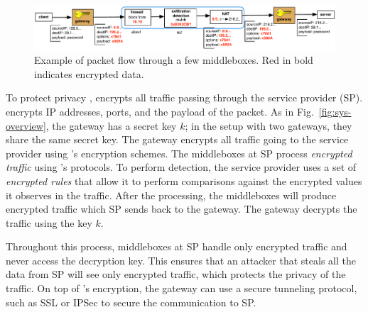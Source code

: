 \begin{figure}[t!]
\centering
  \includegraphics[width=6.7in]{fig/packetpath.pdf}
\caption{Example of packet flow through a few middleboxes. Red in bold indicates encrypted data. \label{fig:packetflow}}
\end{figure}



To protect privacy , \sys encrypts all traffic passing through the service provider (SP).
\sys encrypts IP addresses, ports, and the payload of the packet.
As in Fig.~\ref{fig:sys-overview}, the gateway has a secret key $k$; in the setup with two gateways, they share
the same secret key. The gateway encrypts all traffic going to the service provider using \sys's encryption schemes.
The middleboxes at SP process {\em encrypted traffic} using \sys's protocols. 
To perform detection, the service provider uses a set of {\it encrypted rules} that allow it to perform comparisons against the encrypted values it observes in the traffic.
After the processing, the middleboxes
will produce encrypted traffic which SP sends back to the gateway. The gateway decrypts the traffic using the key $k$.

Throughout this process, middleboxes at SP handle only encrypted traffic and never access the decryption key. This ensures
that an attacker that steals all the data from SP will  see only encrypted traffic, which protects the privacy of the 
traffic. 
On top of \sys's encryption, the gateway can use a secure tunneling protocol, such as SSL or IPSec to secure the communication to SP.

